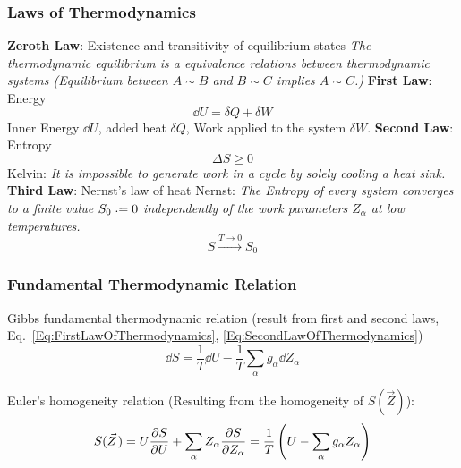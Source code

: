 		\subsubsection{Laws of Thermodynamics}
			\textbf{Zeroth Law}: Existence and transitivity of equilibrium states\newline
			\indent \emph{The thermodynamic equilibrium is a equivalence relations between thermodynamic systems (Equilibrium between $A \sim B$ and $B \sim C$ implies $A \sim C$.)} \nl
			\textbf{First Law}: Energy
			\begin{equation}
				\label{Eq:FirstLawOfThermodynamics}
				\dd U = \delta Q + \delta W
			\end{equation}
			\indent Inner Energy $\dd U$, added heat $\delta Q$, Work applied to the system $\delta W$. \nl
			\textbf{Second Law}: Entropy
			\begin{equation}
				\label{Eq:SecondLawOfThermodynamics}
				\Delta S	\ge 0
			\end{equation}
			\indent Kelvin: \emph{It is impossible to generate work in a cycle by solely cooling a heat sink.}\nl
			\textbf{Third Law}: Nernst's law of heat\newline
			\indent Nernst: \emph{The Entropy of every system converges to a finite value $S_0\defeq 0$ independently of the work parameters $Z_\alpha$ at low temperatures.
				\begin{equation}
					S \stackrel{T \to 0}{\longrightarrow} S_0
					\label{Eq:ThirdLawOfThermodynamics}
				\end{equation}}

		\subsubsection{Fundamental Thermodynamic Relation}
			\noindent
			Gibbs fundamental thermodynamic relation (result from first and second laws, Eq.~\ref{Eq:FirstLawOfThermodynamics}, \ref{Eq:SecondLawOfThermodynamics})
			\begin{equation}
				\label{Eq:GibbsFundamental}
				\dd S = \frac{1}{T} \dd U - \frac{1}{T} \sum_{\alpha} g_\alpha \dd Z_\alpha
			\end{equation}

			\noindent
			Euler's homogeneity relation (Resulting from the homogeneity of $S(\vec{Z})$):
			\begin{equation}
				\label{Eq:EulerHomogenity}
				S(\vec{Z}) = U\pdv{S}{U} + \sum_\alpha Z_\alpha\pdv{S}{Z_\alpha}
				= \frac{1}{T} \left( U-\sum_\alpha g_\alpha Z_\alpha \right)
			\end{equation}

